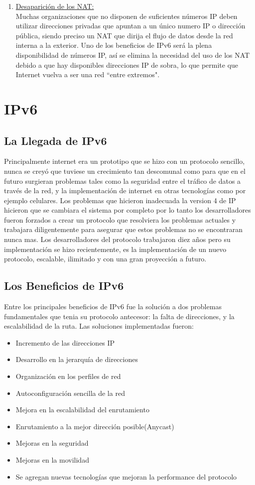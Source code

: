 \documentclass[11pt,a4paper]{article}
\begin{document}
\begin{enumerate}
\item  \underline{Desaparición de los NAT:}\\
Muchas organizaciones que no disponen de suficientes números IP deben utilizar direcciones privadas 
que apuntan a un único numero IP o dirección pública, siendo preciso un NAT que dirija el flujo de 
datos desde la red interna a la exterior. Uno de los beneficios de IPv6 será la plena disponibilidad 
de números IP, así se elimina la necesidad del uso de los NAT debido a que hay disponibles 
direcciones IP de sobra, lo que permite que Internet vuelva a ser una red ``entre extremos".
\end{enumerate}

\section{IPv6} 
\subsection{La Llegada de IPv6}
Principalmente internet era un prototipo que se hizo con un protocolo sencillo, nunca se creyó que 
tuviese un crecimiento tan descomunal como para que en el futuro surgieran problemas tales como la 
seguridad entre el tráfico de datos a través de la red, y la implementación de internet en otras 
tecnologías como por ejemplo celulares. Los problemas que hicieron inadecuada la version 4 de IP 
hicieron que se cambiara el sistema por completo por lo tanto los desarrolladores fueron forzados a 
crear un protocolo que resolviera los problemas actuales y trabajara diligentemente para asegurar 
que estos problemas no se encontraran nunca mas. Los desarrolladores del protocolo trabajaron diez 
años pero su implementación se hizo recientemente, es la implementación de un nuevo protocolo, 
escalable, ilimitado y con una gran proyección a futuro.\par

\subsection{Los Beneficios de IPv6}
Entre los principales beneficios de IPv6 fue la solución a dos problemas fundamentales que tenia su 
protocolo antecesor: la falta de direcciones, y la escalabilidad de la ruta. Las soluciones 
implementadas fueron:
\begin{itemize}
\item Incremento de las direcciones IP
\item Desarrollo en la jerarquía de direcciones
\item Organización en los perfiles de red
\item Autoconfiguración sencilla de la red
\item Mejora en la escalabilidad del enrutamiento
\item Enrutamiento a la mejor dirección posible(Anycast)
\item Mejoras en la seguridad
\item Mejoras en la movilidad
\item Se agregan nuevas tecnologías que mejoran la performance del protocolo
\end{itemize}
\end{document}
